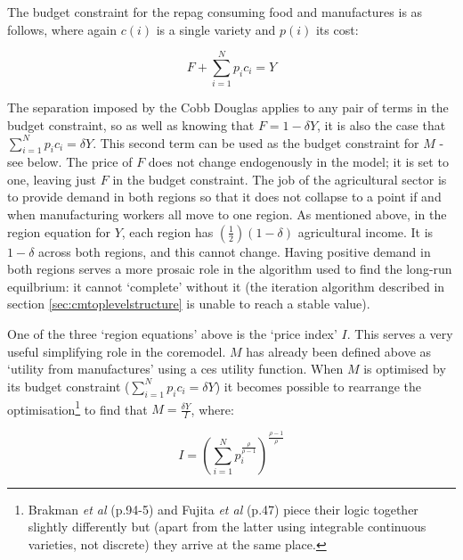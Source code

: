 The budget constraint for the \gls{repag} consuming food and manufactures is as follows, where again $c(i)$ is a single variety and $p(i)$ its cost:

\begin{equation}
F + \sum_{i=1}^{N}p_{i}c_{i} = Y\label{eq:cmbudget}
\end{equation}

The separation imposed by the Cobb Douglas applies to any pair of terms in the budget constraint, so as well as knowing that $F = 1- \delta Y$, it is also the case that $\sum_{i=1}^{N}p_{i}c_{i} = \delta Y$. This second term can be used as the budget constraint for $M$ - see below. The price of $F$  does not change endogenously in the model; it is set to one, leaving just $F$ in the budget constraint. The job of the agricultural sector is to provide demand in both regions so that it does not collapse to a point if and when manufacturing workers all move to one region. As mentioned above, in the region equation for $Y$, each region has $(\frac{1}{2})(1-\delta)$ agricultural income. It is $1-\delta$ across both regions, and this cannot change. Having positive demand in both regions serves a more prosaic role in the algorithm used to find the long-run equilbrium: it cannot `complete' without it (the iteration algorithm described in section \ref{sec:cmtoplevelstructure} is unable to reach a stable value).

One of the three `region equations' above is the `price index' $I$. This serves a very useful simplifying role in the \gls{coremodel}. $M$ has already been defined above as `utility from manufactures' using a \gls{ces} utility function. When $M$ is optimised by its budget constraint ($\sum_{i=1}^{N}p_{i}c_{i} = \delta Y$) it becomes possible to rearrange the optimisation\footnote{Brakman \emph{et al} (p.94-5) and Fujita \emph{et al} (p.47) piece their logic together slightly differently but (apart from the latter using integrable continuous varieties, not discrete) they arrive at the same place.} to find that $M = \frac{\delta Y}{I}$, where:

\begin{equation}
I = \left(\sum_{i=1}^{N}p_{i}^\frac{\rho}{\rho-1}\right)^\frac{\rho-1}{\rho}\label{eq:priceindex}
\end{equation}

